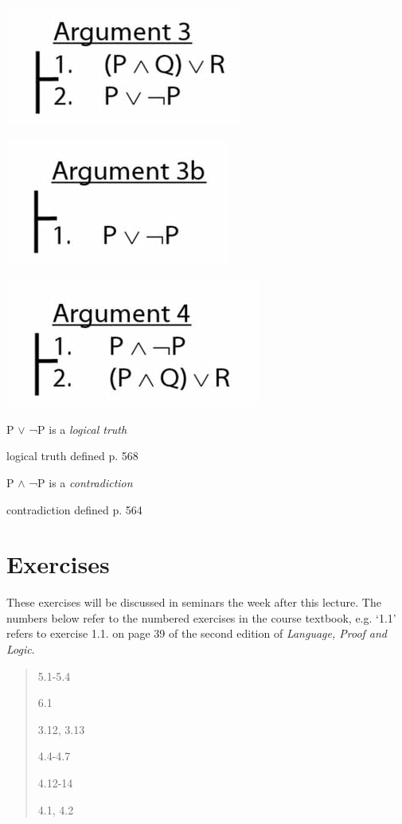 \documentclass[12pt]{extarticle}
\begin{document}
\begin{multicols*}{3}
\begin{center}
\includegraphics[scale=0.3]{img/unit_160_argument3.png}
\end{center}
\begin{center}
\includegraphics[scale=0.3]{img/unit_160_argument3b.png}
\end{center}
\begin{center}
\includegraphics[scale=0.3]{img/unit_160_argument4.png}
\end{center}
P $\lor{}$ ¬P is a \emph{logical truth}
 
logical truth defined p. 568
 
P $\land{}$ ¬P is a \emph{contradiction}
 
contradiction defined p. 564
 
\vfill
\begin{minipage}{\columnwidth}
\section{Exercises}
These exercises will be discussed in seminars the week after this lecture.
The numbers below refer to the numbered exercises in the course textbook, e.g. `1.1' refers to exercise 1.1. on page 39 of the second edition of \emph{Language, Proof and Logic}.
 
\begin{quote}
5.1-5.4
 
6.1
 
3.12, 3.13
 
4.4-4.7
 
4.12-14
 
4.1, 4.2
 
\end{quote}
\end{minipage}



 


\end{multicols*}
\end{document}

